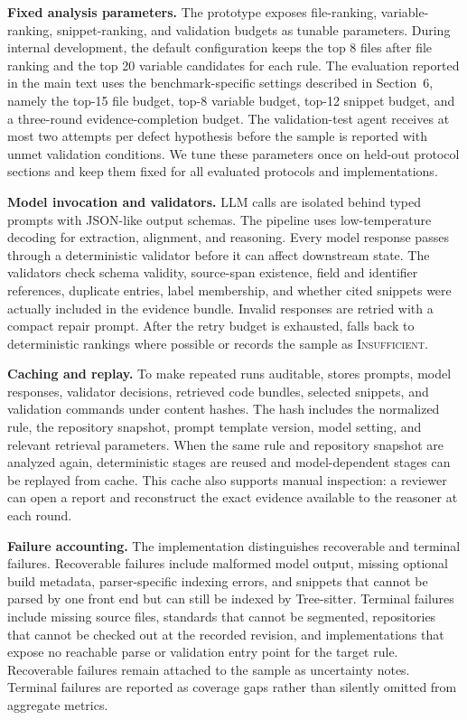 \textbf{Fixed analysis parameters.}
The prototype exposes file-ranking, variable-ranking, snippet-ranking, and
validation budgets as tunable parameters. During internal development, the
default configuration keeps the top 8 files after file ranking and the top 20
variable candidates for each rule. The evaluation reported in the main text
uses the benchmark-specific settings described in Section~6, namely the top-15
file budget, top-8 variable budget, top-12 snippet budget, and a three-round
evidence-completion budget. The validation-test agent receives at most two attempts
per defect hypothesis before the sample is reported with unmet validation
conditions. We tune these parameters once on held-out protocol sections and
keep them fixed for all evaluated protocols and implementations.

\textbf{Model invocation and validators.}
LLM calls are isolated behind typed prompts with JSON-like output schemas. The
pipeline uses low-temperature decoding for extraction, alignment, and
reasoning. Every model response passes through a deterministic validator before
it can affect downstream state. The validators check schema validity,
source-span existence, field and identifier references, duplicate entries,
label membership, and whether cited snippets were actually included in the
evidence bundle. Invalid responses are retried with a compact repair prompt.
After the retry budget is exhausted, \tool{} falls back to deterministic
rankings where possible or records the sample as \textsc{Insufficient}.

\textbf{Caching and replay.}
To make repeated runs auditable, \tool{} stores prompts, model responses,
validator decisions, retrieved code bundles, selected snippets, and validation
commands under content hashes. The hash includes the normalized rule, the
repository snapshot, prompt template version, model setting, and relevant
retrieval parameters. When the same rule and repository snapshot are analyzed
again, deterministic stages are reused and model-dependent stages can be
replayed from cache. This cache also supports manual inspection: a reviewer can
open a report and reconstruct the exact evidence available to the reasoner at
each round.

\textbf{Failure accounting.}
The implementation distinguishes recoverable and terminal failures. Recoverable
failures include malformed model output, missing optional build metadata,
parser-specific indexing errors, and snippets that cannot be parsed by one
front end but can still be indexed by Tree-sitter. Terminal failures include
missing source files, standards that cannot be segmented, repositories that
cannot be checked out at the recorded revision, and implementations that expose
no reachable parse or validation entry point for the target rule. Recoverable
failures remain attached to the sample as uncertainty notes. Terminal failures
are reported as coverage gaps rather than silently omitted from aggregate
metrics.

